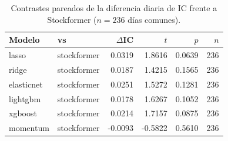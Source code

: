 \begin{table}[htbp]
\centering
\caption{Contrastes pareados de la diferencia diaria de IC frente a Stockformer
($n=236$ días comunes).}
\label{tab:significancia}
\small
\begin{tabular}{llrrrr}
\toprule
Modelo & vs & $\Delta$IC & $t$ & $p$ & $n$ \\
\midrule
lasso & stockformer & 0.0319 & 1.8616 & 0.0639 & 236 \\
ridge & stockformer & 0.0187 & 1.4215 & 0.1565 & 236 \\
elasticnet & stockformer & 0.0251 & 1.5272 & 0.1281 & 236 \\
lightgbm & stockformer & 0.0178 & 1.6267 & 0.1052 & 236 \\
xgboost & stockformer & 0.0214 & 1.7157 & 0.0875 & 236 \\
momentum & stockformer & -0.0093 & -0.5822 & 0.5610 & 236 \\
\bottomrule
\end{tabular}
\end{table}
